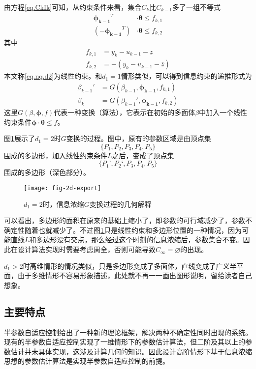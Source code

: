 由方程\eqref{eq.CkIk}可知，从约束条件来看，集合$C_{k}$比$C_{k-1}$多了一组不等式
\begin{equation}%
\label{eq.nq.d2}
\begin{split}%
\bm{\phi_{k-1}}^{T}&\cdot\bm{\theta}\leq f_{k,1}\\
(-\bm{\phi_{k-1}}^{T})&\cdot\bm{\theta}\leq f_{k,2}
\end{split}
\end{equation}
其中
\begin{equation}%
\label{eq.fk}
\begin{split}%
f_{k,1}&=y_{k}-u_{k-1}-\underline{z}\\
f_{k,2}&=-(y_{k}-u_{k-1}-\overline{z})
\end{split}
\end{equation}
本文称\eqref{eq.nq.d2}为线性约束。和$d_{1}=1$情形类似，可以得到信息约束的递推形式为
\begin{equation}%
\begin{split}%
\beta_{k-1}'&=G(\beta_{k-1},\bm{\phi_{k-1}},f_{k,1})\\
\beta_{k}&=G(\beta_{k-1}',\bm{\phi_{k-1}},f_{k,2})
\end{split}
\end{equation}
这里$G(\beta,\bm{\phi},f)$代表一种变换（算法），它表示在初始的多面体$\beta$中加入一个线性约束条件$\bm{\phi}\cdot\bm{\theta}\leq f$。

图\ref{fig.2d.export}展示了$d_{1}=2$时$G$变换的过程。图中，原有的参数区域是由顶点集
\begin{equation}%
\{P_{1},P_{2},P_{3},P_{4},P_{5}\}
\end{equation}
围成的多边形，加入线性约束条件$L$之后，变成了顶点集
\begin{equation}%
\{P_{1}’,P_{2}‘,P_{3},P_{4},P_{5}\}
\end{equation}
围成的多边形（深色部分）。

\begin{figure}
	\centering
	\texttt{[image: fig-2d-export]}\\	 %
	\caption{$d_{1}=2$时，信息浓缩$G$变换过程的几何解释}
	\label{fig.2d.export}
\end{figure}

可以看出，多边形的面积在原来的基础上缩小了，即参数的可行域减少了，参数不确定性随着也就减少了。不过图\ref{fig.2d.export}只是线性约束和多边形位置的一种情况，因为可能直线$L$和多边形没有交点，那么经过这个时刻的信息浓缩后，参数集合不变。因此在设计算法实现时需要考虑周全，否则可能导致$C_{\infty}=\varnothing$的出现。

$d_{1}>2$时高维情形的情况类似，只是多边形变成了多面体，直线变成了广义半平面，由于多维情形不容易形象描述，此处就不再一一画出图形说明，留给读者自己想象。

\begin{algo}%
\label{algo:d=2}
\end{algo}
\subsection{主要特点}
半参数自适应控制给出了一种新的理论框架，解决两种不确定性同时出现的系统。现有的半参数自适应控制实现了一维情形下的参数估计算法，但二阶及其以上的参数估计并未具体实现，这涉及计算几何的知识。因此设计高阶情形下基于信息浓缩思想的参数估计算法是实现半参数自适应控制的前提。